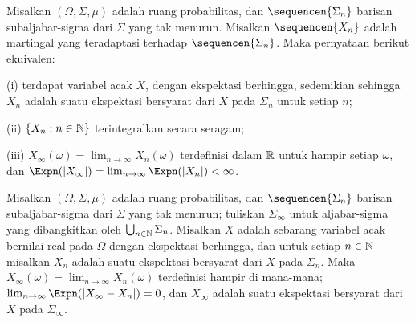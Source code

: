 Misalkan $(\Omega,\Sigma,\mu)$ adalah ruang probabilitas, dan
$\sequencen{\Sigma_n}$ barisan subaljabar-sigma dari $\Sigma$ yang tak
menurun. Misalkan $\sequencen{X_n}$ adalah martingal yang teradaptasi terhadap
$\sequencen{\Sigma_n}$. Maka pernyataan berikut ekuivalen:

\quad(i) terdapat variabel acak $X$, dengan ekspektasi berhingga, sedemikian
sehingga $X_n$ adalah suatu ekspektasi bersyarat dari $X$ pada $\Sigma_n$
untuk setiap $n$;

\quad (ii) $\{X_n:n\in\Bbb N\}$ terintegralkan secara seragam;

\quad (iii) $X_{\infty}(\omega)=\lim_{n\to\infty}X_n(\omega)$ terdefinisi
dalam $\Bbb R$ untuk hampir setiap $\omega$, dan
$\Expn(|X_{\infty}|)=\lim_{n\to\infty}\Expn(|X_n|)<\infty$.


 Misalkan $(\Omega,\Sigma,\mu)$ adalah ruang
probabilitas, dan $\sequencen{\Sigma_n}$ barisan subaljabar-sigma dari
$\Sigma$ yang tak menurun; tuliskan $\Sigma_{\infty}$ untuk aljabar-sigma yang
dibangkitkan oleh $\bigcup_{n\in\Bbb N}\Sigma_n$. Misalkan $X$ adalah
sebarang variabel acak bernilai real pada $\Omega$ dengan ekspektasi berhingga,
dan untuk setiap $n\in\Bbb N$ misalkan $X_n$ adalah suatu ekspektasi bersyarat
dari $X$ pada $\Sigma_n$. Maka
$X_{\infty}(\omega)=\lim_{n\to\infty}X_n(\omega)$ terdefinisi hampir di
mana-mana; $\lim_{n\to\infty}\Expn(|X_{\infty}-X_n|)=0$, dan $X_{\infty}$
adalah suatu ekspektasi bersyarat dari $X$ pada $\Sigma_{\infty}$.


